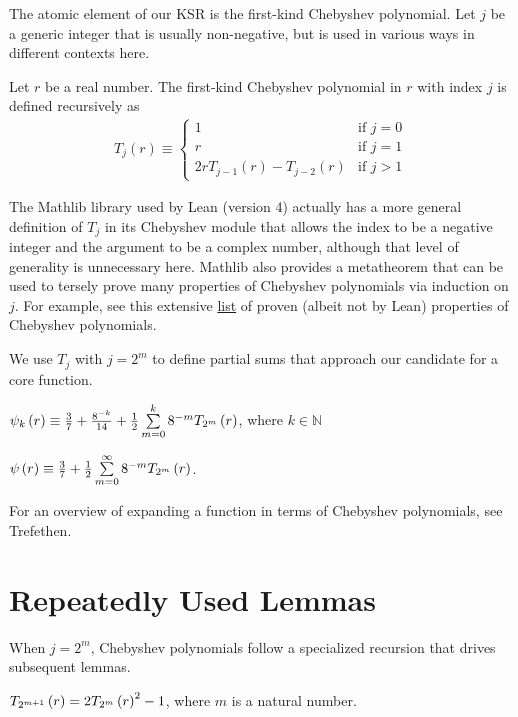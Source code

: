 The atomic element of our KSR is the first-kind Chebyshev polynomial. Let $j$ be a generic integer that is usually non-negative, but is used in various ways in different contexts here.
\begin{definition}
  \label{def:T}
  \leanok
  Let $r$ be a real number. The first-kind Chebyshev polynomial in $r$ with index $j$ is defined recursively as
  \begin{align*}
T_j\left(r\right) \equiv 
\begin{cases}
1 & \text{if } j = 0 \\
r & \text{if } j = 1 \\
2 r T_{j - 1}\left(r\right) - T_{j - 2}\left(r\right) & \text{if } j > 1
\end{cases}
  \end{align*}
\end{definition}
\noindent The Mathlib library used by Lean (version 4) actually has a more general definition of $T_j$ in its Chebyshev module that allows the index to be a negative integer and the argument to be a complex number, although that level of generality is unnecessary here. Mathlib also provides a metatheorem that can be used to tersely prove many properties of Chebyshev polynomials via induction on $j$. For example, see this extensive \href{https://fungrim.org/topic/Chebyshev_polynomials/}{list} of proven (albeit not by Lean) properties of Chebyshev polynomials.

We use $T_j$ with $j = 2^m$ to define partial sums that approach our candidate for a core function.
\begin{definition}
  \label{def:approx}
  \leanok
  $\psi_k\left(r\right) \equiv \frac{3}{7} + \frac{8^{-k}}{14} + \frac{1}{2} \sum\limits_{m = 0}^{k} 8^{-m} T_{2^{m}}\left(r\right)$, where $k \in \mathbb{N}$
\end{definition}
\begin{definition}
  \label{def:core}
  \leanok
  $\psi\left(r\right) \equiv \frac{3}{7} + \frac{1}{2} \sum\limits_{m = 0}^{\infty} 8^{-m} T_{2^{m}}\left(r\right)$.
\end{definition}
\noindent For an overview of expanding a function in terms of Chebyshev polynomials, see Trefethen.

\section{Repeatedly Used Lemmas}\label{sec:RepeatedlyUsedLemmas}

When $j = 2^m$, Chebyshev polynomials follow a specialized recursion that drives subsequent lemmas.
\begin{lemma}[Doubling]
  \label{lem:TT_recursion}
  \leanok
  $T_{2^{m + 1}}\left(r\right) = 2T_{2^{m}}\left(r\right)^2 - 1$, where $m$ is a natural number.
\end{lemma}
  
